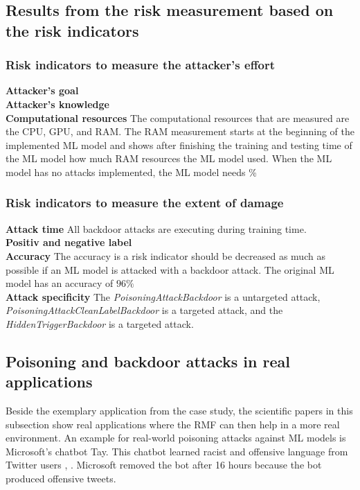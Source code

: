 \subsection{Results from the risk measurement based on the risk indicators}

\subsubsection*{Risk indicators to measure the attacker's effort}
\textbf{Attacker's goal} \\
\textbf{Attacker's knowledge} \\
\textbf{Computational resources} The computational resources that are measured are the CPU, GPU, and RAM. The RAM measurement starts at the beginning of the implemented ML model and shows after finishing the training and testing time of the ML model how much RAM resources the ML model used. When the ML model has no attacks implemented, the ML model needs \%

\subsubsection*{Risk indicators to measure the extent of damage}
\textbf{Attack time} All backdoor attacks are executing during training time. \\
\textbf{Positiv and negative label} \\
\textbf{Accuracy} The accuracy is a risk indicator should be decreased as much as possible if an ML model is attacked with a backdoor attack. The original ML model has an accuracy of $96\%$ \\
\textbf{Attack specificity} The \textit{PoisoningAttackBackdoor} is a untargeted attack, \textit{PoisoningAttackCleanLabelBackdoor} is a targeted attack, and the \textit{HiddenTriggerBackdoor} is a targeted attack.

\subsection{Poisoning and backdoor attacks in real applications}

Beside the exemplary application from the case study, the scientific papers in this subsection show real applications where the RMF can then help in a more real environment. An example for real-world poisoning attacks against ML models is Microsoft's chatbot Tay. This chatbot learned racist and offensive language from Twitter users \cite{DBLP:conf/iciot/BaracaldoCLSZ18}, \cite{DBLP:conf/ccs/BaracaldoCLS17}. Microsoft removed the bot after 16 hours because the bot produced offensive tweets.
